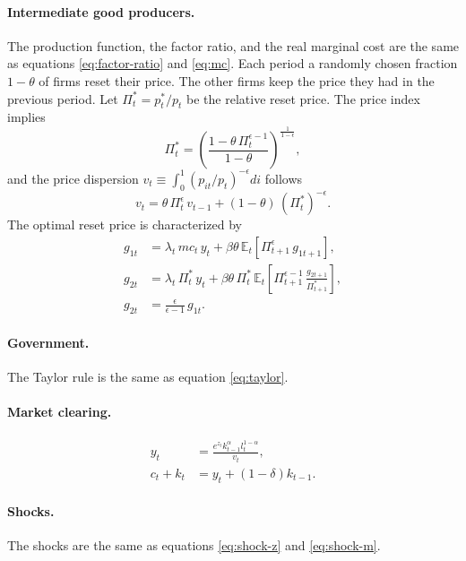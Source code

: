 \documentclass[12pt]{article}
\begin{document}
\paragraph{Intermediate good producers.} The production function, the factor ratio, and the real marginal cost are the same as equations \cref{eq:factor-ratio} and \cref{eq:mc}. Each period a randomly chosen fraction $1-\theta$ of firms reset their price. The other firms keep the price they had in the previous period. Let $\Pi_t^{*} = p_t^{*}/p_t$ be the relative reset price. The price index implies
\begin{equation}
\Pi_t^{*} = \left( \frac{1 - \theta\, \Pi_t^{\epsilon-1}}{1-\theta} \right)^{\frac{1}{1-\epsilon}} ,
\end{equation}
and the price dispersion $v_t \equiv \int_0^1 (p_{it}/p_t)^{-\epsilon} di$ follows
\begin{equation}
v_t = \theta\, \Pi_t^{\epsilon}\, v_{t-1} + (1-\theta)\, (\Pi_t^{*})^{-\epsilon} .
\end{equation}
The optimal reset price is characterized by
\begin{align}
g_{1t} &= \lambda_t\, mc_t\, y_t + \beta\theta\, \mathbb{E}_t \left[ \Pi_{t+1}^{\epsilon}\, g_{1t+1} \right], \\
g_{2t} &= \lambda_t\, \Pi_t^{*}\, y_t + \beta\theta\, \Pi_t^{*}\, \mathbb{E}_t \left[ \Pi_{t+1}^{\epsilon-1}\, \frac{g_{2t+1}}{\Pi_{t+1}^{*}} \right], \\
g_{2t} &= \frac{\epsilon}{\epsilon-1}\, g_{1t} .
\end{align}

\paragraph{Government.} The Taylor rule is the same as equation \cref{eq:taylor}.

\paragraph{Market clearing.}
\begin{align}
y_t &= \frac{e^{z_t} k_{t-1}^{\alpha} l_t^{1-\alpha}}{v_t}, \\
c_t + k_t &= y_t + (1-\delta) k_{t-1} .
\end{align}

\paragraph{Shocks.} The shocks are the same as equations \cref{eq:shock-z} and \cref{eq:shock-m}.
\end{document}
